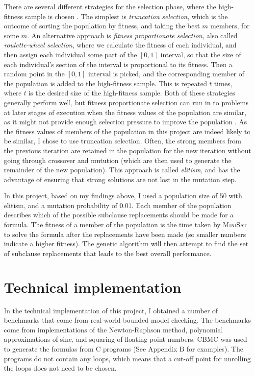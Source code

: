 \documentclass[proof,pdftex,11pt,a4,titlepage]{article}
\begin{document}
There are several different strategies for the selection phase, where the high-fitness sample is chosen \cite{Thierens:1994}. The simplest is \emph{truncation selection}, which is the outcome of sorting the population by fitness, and taking the best $m$ members, for some $m$. An alternative approach is \emph{fitness proportionate selection}, also called \emph{roulette-wheel selection}, where we calculate the fitness of each individual, and then assign each individual some part of the $[0,1]$ interval, so that the size of each individual's section of the interval is proportional to its fitness. Then a random point in the $[0,1]$ interval is picked, and the corresponding member of the population is added to the high-fitness sample. This is repeated $t$ times, where $t$ is the desired size of the high-fitness sample. Both of these strategies generally perform well, but fitness proportionate selection can run in to problems at later stages of execution when the fitness values of the population are similar, as it might not provide enough selection pressure to improve the population \cite{Whitley:1989}. As the fitness values of members of the population in this project are indeed likely to be similar, I chose to use truncation selection. Often, the strong members from the previous iteration are retained in the population for the new iteration without going through crossover and mutution (which are then used to generate the remainder of the new population). This approach is called \emph{elitism}, and has the advantage of ensuring that strong solutions are not lost in the mutation step.

In this project, based on my findings above, I used a population size of 50 with elitism, and a mutation probability of 0.01. Each member of the population describes which of the possible subclause replacements should be made for a formula. The fitness of a member of the population is the time taken by \textsc{MiniSat} to solve the formula after the replacements have been made (so smaller numbers indicate a higher fitness). The genetic algorithm will then attempt to find the set of subclause replacements that leads to the best overall performance.

\section{Technical implementation}

In the technical implementation of this project, I obtained a number of benchmarks that come from real-world bounded model checking. The benchmarks come from implementations of the Newton-Raphson method, polynomial approximations of sine, and squaring of floating-point numbers. CBMC was used to generate the formulas from C programs (See Appendix B for examples). The programs do not contain any loops, which means that a cut-off point for unrolling the loops does not need to be chosen.
\end{document}

